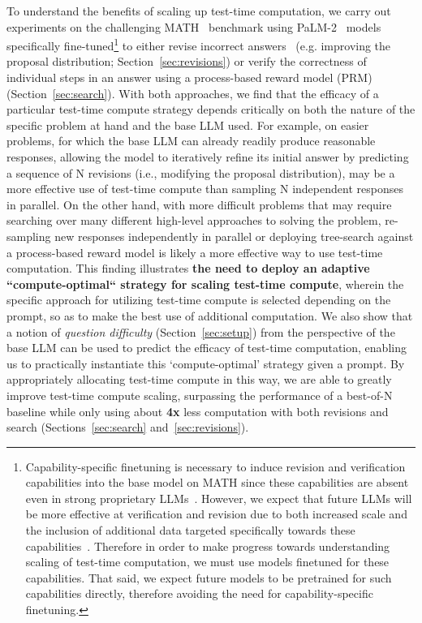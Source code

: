 To understand the benefits of scaling up test-time computation, we carry out experiments on the challenging MATH~\citep{hendrycks2021measuring} benchmark using PaLM-2~\citep{anil2023palm} models specifically fine-tuned\footnote{Capability-specific finetuning is necessary to induce revision and verification capabilities into the base model on MATH since these capabilities are absent even in strong proprietary LLMs~\citep{huang2023large,sharma2024criticalevaluationaifeedback}. However, we expect that future LLMs will be more effective at verification and revision due to both increased scale and the inclusion of additional data targeted specifically towards these capabilities~\citep{predictemergence,blakeney2024doesdatasparkjoy,llmcriticscatchbugs}. Therefore in order to make progress towards understanding scaling of test-time computation, we must use models finetuned for these capabilities. That said, we expect future models to be pretrained for such capabilities directly, therefore avoiding the need for capability-specific finetuning.} to either revise incorrect answers~\citep{qu2024recursive} (e.g. improving the proposal distribution; Section~\ref{sec:revisions}) or verify the correctness of individual steps in an answer using a process-based reward model (PRM)~\citep{lightman2023lets,wang2023mathshepherd} (Section~\ref{sec:search}).
With both approaches, we find that the efficacy of a particular test-time compute strategy depends critically on both the nature of the specific problem at hand and the base LLM used. For example, on easier problems, for which the base LLM can already readily produce reasonable responses, allowing the model to iteratively refine its initial answer by predicting a sequence of N revisions (i.e., modifying the proposal distribution), may be a more effective use of test-time compute than sampling N independent responses in parallel. On the other hand, with more difficult problems that may require searching over many different high-level approaches to solving the problem, re-sampling new responses independently in parallel or deploying tree-search against a process-based reward model is likely a more effective way to use test-time computation.
This finding illustrates \textbf{the need to deploy an adaptive {``compute-optimal``} strategy for scaling test-time compute}, wherein the specific approach for utilizing test-time compute is selected depending on the prompt, so as to make the best use of additional computation.
We also show that a notion of \emph{question difficulty} (Section~\ref{sec:setup}) from the perspective of the base LLM can be used to predict the efficacy of test-time computation, enabling us to practically instantiate this `compute-optimal' strategy given a prompt. By appropriately allocating test-time compute in this way, we are able to greatly improve test-time compute scaling, surpassing the performance of a best-of-N baseline while only using about \textbf{4x} less computation with both revisions and search (Sections~\ref{sec:search} and~\ref{sec:revisions}).


